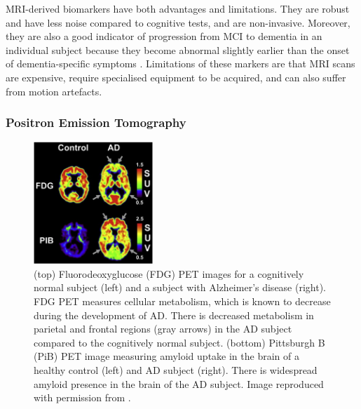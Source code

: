 MRI-derived biomarkers have both advantages and limitations. They are robust and have less noise compared to cognitive tests, and are non-invasive. Moreover, they are also a good indicator of progression from MCI to dementia in an individual subject because they become abnormal slightly earlier than the onset of dementia-specific symptoms \cite{jack2010hypothetical, jack2013update}. Limitations of these markers are that MRI scans are expensive,  require specialised equipment to be acquired, and can also suffer from motion artefacts.

\subsubsection{Positron Emission Tomography}
\label{sec:bckPet}

\begin{figure}
\centering
\includegraphics[width=0.4\textwidth]{images/fdgAd}
\caption[FDG PET images of healthy and AD subjects]{(top) Fluorodeoxyglucose (FDG) PET images for a cognitively normal subject (left) and a subject with Alzheimer's disease (right). FDG PET measures cellular metabolism, which is known to decrease during the development of AD. There is decreased metabolism in parietal and frontal regions (gray arrows) in the AD subject compared to the cognitively normal subject. (bottom) Pittsburgh B (PiB) PET image measuring amyloid uptake in the brain of a healthy control (left) and AD subject (right). There is widespread amyloid presence in the brain of the AD subject. Image reproduced with permission from \cite{cohen2014early}.}
\label{fig:bckFdgAd}
\end{figure}

